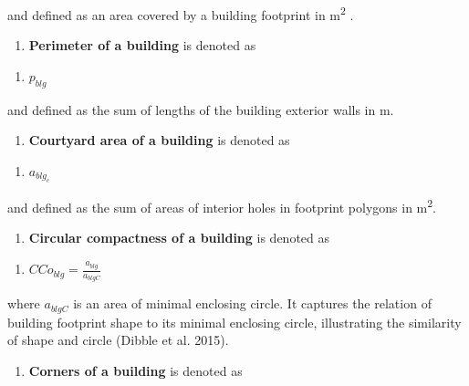 \documentclass[
  letterpaper,
  DIV=11,
  numbers=noendperiod]{scrartcl}
\providecommand{\tightlist}{%
  \setlength{\itemsep}{0pt}\setlength{\parskip}{0pt}}\usepackage{longtable,booktabs,array}
\begin{document}
and defined as an area covered by a building footprint in
m\textsuperscript{2} .

\begin{enumerate}
\def\labelenumi{\arabic{enumi}.}
\setcounter{enumi}{1}
\tightlist
\item
  \textbf{Perimeter of a building} is denoted as
\end{enumerate}

\begin{enumerate}
\def\labelenumi{(\arabic{enumi})}
\setcounter{enumi}{1}
\tightlist
\item
  \(p_{blg}\)
\end{enumerate}

and defined as the sum of lengths of the building exterior walls in m.

\begin{enumerate}
\def\labelenumi{\arabic{enumi}.}
\setcounter{enumi}{2}
\tightlist
\item
  \textbf{Courtyard area of a building} is denoted as
\end{enumerate}

\begin{enumerate}
\def\labelenumi{(\arabic{enumi})}
\setcounter{enumi}{2}
\tightlist
\item
  \(a_{blg_c}\)
\end{enumerate}

and defined as the sum of areas of interior holes in footprint polygons
in m\textsuperscript{2}.

\begin{enumerate}
\def\labelenumi{\arabic{enumi}.}
\setcounter{enumi}{3}
\tightlist
\item
  \textbf{Circular compactness of a building} is denoted as
\end{enumerate}

\begin{enumerate}
\def\labelenumi{(\arabic{enumi})}
\setcounter{enumi}{3}
\tightlist
\item
  \(CCo_{blg} = \frac{a_{blg}}{a_{blgC}}\)
\end{enumerate}

where \(a_{blgC}\) is an area of minimal enclosing circle. It captures
the relation of building footprint shape to its minimal enclosing
circle, illustrating the similarity of shape and circle (Dibble et al.
2015).

\begin{enumerate}
\def\labelenumi{\arabic{enumi}.}
\setcounter{enumi}{4}
\tightlist
\item
  \textbf{Corners of a building} is denoted as
\end{enumerate}
\end{document}

